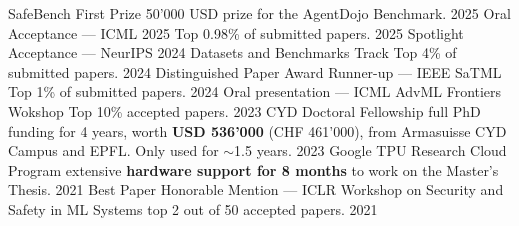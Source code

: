 
\begin{cvhonors}

  \cvhonor
    {SafeBench First Prize} %
    {50'000 USD prize for the AgentDojo Benchmark.} %
    {} %
    {2025} %
  \cvhonor
    {Oral Acceptance --- ICML 2025} %
    {Top 0.98\% of submitted papers.} %
    {} %
    {2025} %
  \cvhonor
    {Spotlight Acceptance --- NeurIPS 2024 Datasets and Benchmarks Track} %
    {Top 4\% of submitted papers.} %
    {} %
    {2024} %
  \cvhonor
    {Distinguished Paper Award Runner-up --- IEEE SaTML} %
    {Top 1\% of submitted papers.} %
    {} %
    {2024} %
  \cvhonor
    {Oral presentation --- ICML AdvML Frontiers Wokshop} %
    {Top 10\% accepted papers.} %
    {} %
    {2023} %
  \cvhonor
    {CYD Doctoral Fellowship} %
    {full PhD funding for 4 years, worth \textbf{USD 536'000} (CHF 461'000), from Armasuisse CYD Campus and EPFL. Only used for $\sim$1.5 years.} %
    {} %
    {2023} %
  \cvhonor
    {Google TPU Research Cloud Program} %
    {extensive \textbf{hardware support for 8 months} to work on the Master's Thesis.} %
    {} %
    {2021} %
  \cvhonor
    {Best Paper Honorable Mention --- ICLR Workshop on Security and Safety in ML Systems} %
    {top 2 out of 50 accepted papers.} %
    {} %
    {2021} %

\end{cvhonors}

